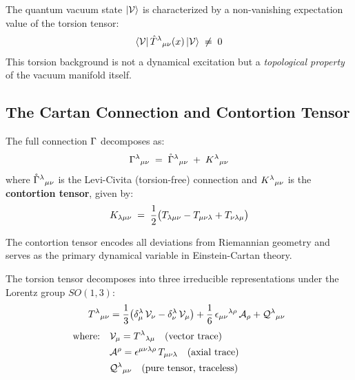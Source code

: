 \begin{postulate}
\label{post:torsion}
The quantum vacuum state $\ket{\mathcal{V}}$ is characterized by a non-vanishing expectation value of the torsion tensor:
\begin{equation}
    \langle \mathcal{V} | \, \hat{T}^\lambda{}_{\mu\nu}(x) \, | \mathcal{V} \rangle \;\neq\; 0
\end{equation}
This torsion background is not a dynamical excitation but a \textit{topological property} of the vacuum manifold itself.
\end{postulate}

\subsection{The Cartan Connection and Contortion Tensor}

The full connection $\Gamma$ decomposes as:
\begin{equation}
    \Gamma^\lambda{}_{\mu\nu} \;=\; \mathring{\Gamma}^\lambda{}_{\mu\nu} \;+\; K^\lambda{}_{\mu\nu}
\end{equation}
where $\mathring{\Gamma}^\lambda{}_{\mu\nu}$ is the Levi-Civita (torsion-free) connection and $K^\lambda{}_{\mu\nu}$ is the \textbf{contortion tensor}, given by:
\begin{equation}
    K_{\lambda\mu\nu} \;=\; \frac{1}{2}\big(T_{\lambda\mu\nu} - T_{\mu\nu\lambda} + T_{\nu\lambda\mu}\big)
\end{equation}

The contortion tensor encodes all deviations from Riemannian geometry and serves as the primary dynamical variable in Einstein-Cartan theory.

\begin{definition}
The torsion tensor decomposes into three irreducible representations under the Lorentz group $SO(1,3)$:
\begin{align}
    T^\lambda{}_{\mu\nu} &= \frac{1}{3}\big(\delta^\lambda_\mu \,\mathcal{V}_\nu - \delta^\lambda_\nu \,\mathcal{V}_\mu\big) 
                                   + \frac{1}{6}\,\epsilon_{\mu\nu}{}^{\lambda\rho}\,\mathcal{A}_\rho 
                                   + \mathcal{Q}^\lambda{}_{\mu\nu} \\[0.3em]
    \text{where:}\quad & \mathcal{V}_\mu = T^\lambda{}_{\lambda\mu} \quad \text{(vector trace)} \\
    & \mathcal{A}^\rho = \epsilon^{\mu\nu\lambda\rho}\,T_{\mu\nu\lambda} \quad \text{(axial trace)} \\
    & \mathcal{Q}^\lambda{}_{\mu\nu} \quad \text{(pure tensor, traceless)}
\end{align}
\end{definition}

